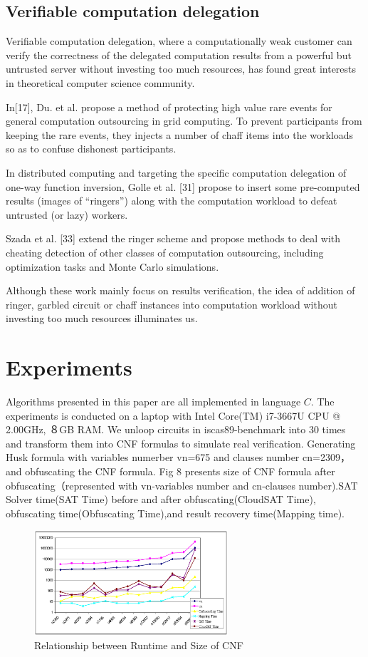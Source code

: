 \documentclass[runningheads,a4paper]{llncs}
\begin{document}
\subsection{Verifiable computation delegation}

Verifiable computation delegation, where a computationally weak customer can verify the correctness of the delegated computation results from a powerful but untrusted server without investing too much resources, has found great interests in theoretical computer science community.

In[17], Du. et al. propose a method of protecting high value rare events for general computation outsourcing in grid computing. To prevent participants from keeping the rare events, they injects a number of chaff items into the workloads so as to confuse dishonest participants.

In distributed computing and targeting the specific computation delegation of one-way function inversion, Golle et al. [31] propose to insert some pre-computed results (images of “ringers”) along with the computation workload to defeat untrusted (or lazy) workers. 

Szada et al. [33] extend the ringer scheme and propose methods to deal with cheating detection of other classes of computation outsourcing, including optimization tasks and Monte Carlo simulations.

Although these work mainly focus on results verification, the idea of addition of ringer, garbled circuit or chaff instances into computation workload without investing too much resources illuminates us.
\section{Experiments} 

Algorithms presented in this paper are all implemented in language $C$.
The experiments is conducted on a laptop with Intel Core(TM) i7-3667U CPU @ 2.00GHz, ８GB RAM. 
We unloop circuits in iscas89-benchmark into 30 times and transform them into CNF formulas to simulate real verification.
Generating Husk formula with variables numerber vn=675 and clauses number cn=2309，and obfuscating the CNF formula. 
Fig 8 presents size of CNF formula after obfuscating（represented with vn-variables number and cn-clauses number).SAT Solver time(SAT Time) before and after obfuscating(CloudSAT Time),
obfuscating time(Obfuscating Time),and result recovery time(Mapping time).


\begin{figure}
\centering
\includegraphics[width=7.2cm]{p1}
\caption{Relationship between Runtime and Size of CNF }
\end{figure}
\end{document}
